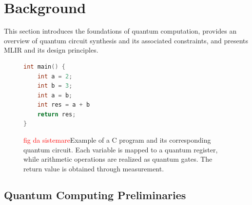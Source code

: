 \section{Background}
\label{sec:background}
This section introduces the foundations of quantum computation, provides an overview of quantum circuit synthesis and its associated constraints, and presents MLIR and its design principles.



\begin{figure}[t]
\begin{minipage}[c]{0.42\linewidth}
\begin{lstlisting}[language=C, basicstyle=\ttfamily\footnotesize, frame=none]
int main() {
    int a = 2;
    int b = 3;
    int a = b;
    int res = a + b
    return res;
}
\end{lstlisting}

\end{minipage}%

\begin{minipage}[c]{0.56\linewidth}

\end{minipage}
\caption{\textcolor{red}{fig da sistemare}Example of a C program and its corresponding quantum circuit. Each variable is mapped to a quantum register, while arithmetic operations are realized as quantum gates. The return value is obtained through measurement.}
\label{fig:c-to-circuit}
\end{figure}


\subsection{Quantum Computing Preliminaries}
\label{sec:quantum-preliminaries}

